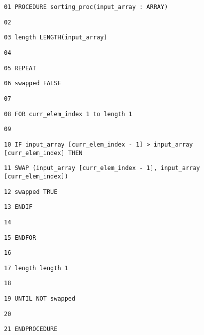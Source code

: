 \noindent %
\noindent\begin{minipage}[t]{1\columnwidth}%
\texttt{01 PROCEDURE sorting\_proc(input\_array : ARRAY) }

\texttt{02}

\texttt{03 \qquad{}length \textleftarrow{} LENGTH(input\_array) }

\texttt{04}

\texttt{05 \qquad{}REPEAT }

\texttt{06 \qquad{}\qquad{}swapped \textleftarrow{} FALSE }

\texttt{07}

\texttt{08 \qquad{}\qquad{}FOR curr\_elem\_index \textleftarrow{}
1 to length \textendash{} 1 }

\texttt{09}

\texttt{10 \qquad{}\qquad{}\qquad{}IF input\_array {[}curr\_elem\_index
- 1{]} > input\_array {[}curr\_elem\_index{]} THEN }

\texttt{11 \qquad{}\qquad{}\qquad{}\qquad{}SWAP (input\_array
{[}curr\_elem\_index - 1{]}, input\_array {[}curr\_elem\_index{]}) }

\texttt{12 \qquad{}\qquad{}\qquad{}\qquad{}swapped \textleftarrow{}
TRUE }

\texttt{13 \qquad{}\qquad{}\qquad{}ENDIF}

\texttt{14 }

\texttt{15 \qquad{}\qquad{}ENDFOR}

\texttt{16}

\texttt{17 \qquad{}\qquad{}length \textleftarrow{} length \textendash{}
1 }

\texttt{18 }

\texttt{19 \qquad{}UNTIL NOT swapped }

\texttt{20}

\texttt{21 ENDPROCEDURE }%
\end{minipage}

